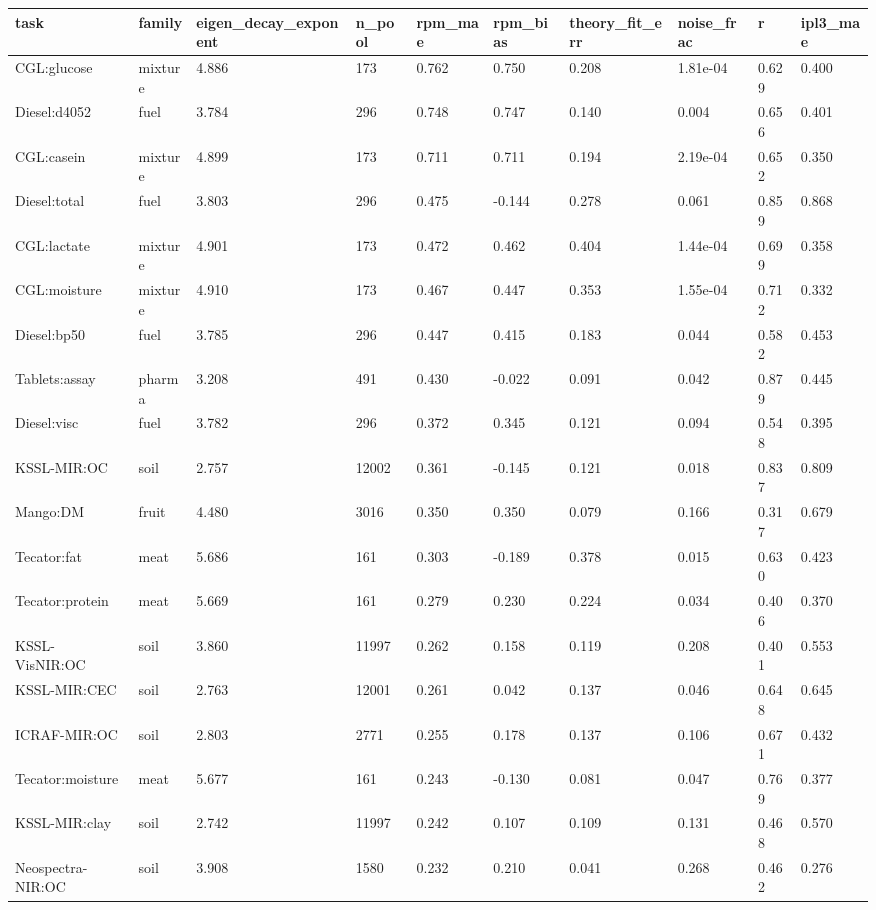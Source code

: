 \begin{tabular}{llllllllll}
\hline
task & family & eigen\_decay\_exponent & n\_pool & rpm\_mae & rpm\_bias & theory\_fit\_err & noise\_frac & r & ipl3\_mae \\
\hline
CGL:glucose & mixture & 4.886 & 173 & 0.762 & 0.750 & 0.208 & 1.81e-04 & 0.629 & 0.400 \\
Diesel:d4052 & fuel & 3.784 & 296 & 0.748 & 0.747 & 0.140 & 0.004 & 0.656 & 0.401 \\
CGL:casein & mixture & 4.899 & 173 & 0.711 & 0.711 & 0.194 & 2.19e-04 & 0.652 & 0.350 \\
Diesel:total & fuel & 3.803 & 296 & 0.475 & -0.144 & 0.278 & 0.061 & 0.859 & 0.868 \\
CGL:lactate & mixture & 4.901 & 173 & 0.472 & 0.462 & 0.404 & 1.44e-04 & 0.699 & 0.358 \\
CGL:moisture & mixture & 4.910 & 173 & 0.467 & 0.447 & 0.353 & 1.55e-04 & 0.712 & 0.332 \\
Diesel:bp50 & fuel & 3.785 & 296 & 0.447 & 0.415 & 0.183 & 0.044 & 0.582 & 0.453 \\
Tablets:assay & pharma & 3.208 & 491 & 0.430 & -0.022 & 0.091 & 0.042 & 0.879 & 0.445 \\
Diesel:visc & fuel & 3.782 & 296 & 0.372 & 0.345 & 0.121 & 0.094 & 0.548 & 0.395 \\
KSSL-MIR:OC & soil & 2.757 & 12002 & 0.361 & -0.145 & 0.121 & 0.018 & 0.837 & 0.809 \\
Mango:DM & fruit & 4.480 & 3016 & 0.350 & 0.350 & 0.079 & 0.166 & 0.317 & 0.679 \\
Tecator:fat & meat & 5.686 & 161 & 0.303 & -0.189 & 0.378 & 0.015 & 0.630 & 0.423 \\
Tecator:protein & meat & 5.669 & 161 & 0.279 & 0.230 & 0.224 & 0.034 & 0.406 & 0.370 \\
KSSL-VisNIR:OC & soil & 3.860 & 11997 & 0.262 & 0.158 & 0.119 & 0.208 & 0.401 & 0.553 \\
KSSL-MIR:CEC & soil & 2.763 & 12001 & 0.261 & 0.042 & 0.137 & 0.046 & 0.648 & 0.645 \\
ICRAF-MIR:OC & soil & 2.803 & 2771 & 0.255 & 0.178 & 0.137 & 0.106 & 0.671 & 0.432 \\
Tecator:moisture & meat & 5.677 & 161 & 0.243 & -0.130 & 0.081 & 0.047 & 0.769 & 0.377 \\
KSSL-MIR:clay & soil & 2.742 & 11997 & 0.242 & 0.107 & 0.109 & 0.131 & 0.468 & 0.570 \\
Neospectra-NIR:OC & soil & 3.908 & 1580 & 0.232 & 0.210 & 0.041 & 0.268 & 0.462 & 0.276 \\

\end{tabular}
